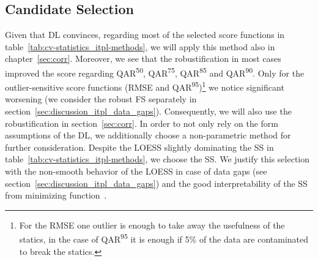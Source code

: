 {    \subsection{Candidate Selection}{\label{sec:itpl_candiate_selection}
        Given that DL convinces, regarding most of the selected score functions in table~\ref{tab:cv-statistics_itpl-methods}, we will apply this method also in chapter~\ref{sec:corr}. Moreover, we see that the robustification in most cases improved the score regarding QAR\textsuperscript{50}, QAR\textsuperscript{75}, QAR\textsuperscript{85} and QAR\textsuperscript{90}. Only for the outlier-sensitive score functions (RMSE and QAR\textsuperscript{95})\footnote{For the RMSE one outlier is enough to take away the usefulness of the statics, in the case of QAR\textsuperscript{95} it is enough if 5\% of the data are contaminated to break the statics.} we notice significant worsening (we consider the robust FS separately in section~\ref{sec:discussion_itpl_data_gaps}). Consequently, we will also use the robustification in section~\ref{sec:corr}.
        In order to not only rely on the form assumptions of the DL, we additionally choose a non-parametric method for further consideration. Despite the LOESS slightly dominating the SS in table~\ref{tab:cv-statistics_itpl-methods}, we choose the SS. We justify this selection with the non-smooth behavior of the LOESS in case of data gaps (see section~\ref{sec:discussion_itpl_data_gaps}) and the good interpretability of the SS from minimizing function~.
    }

}
